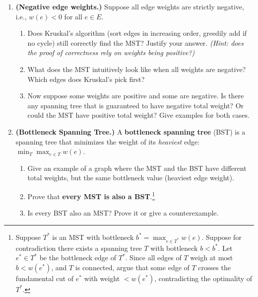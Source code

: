 \documentclass[9pt]{book}
\begin{document}
\begin{enumerate}[label=\arabic*.]
\begin{enumerate}
    \item \textbf{(Negative edge weights.)}
    Suppose all edge weights are strictly negative, i.e., $w(e) < 0$ for all $e \in E$.
    \begin{enumerate}
        \item Does Kruskal's algorithm (sort edges in increasing order, greedily add if no cycle) still correctly find the MST? Justify your answer. \textit{(Hint: does the proof of correctness rely on weights being positive?)}
        \item What does the MST intuitively look like when all weights are negative? Which edges does Kruskal's pick first?
        \item Now suppose some weights are positive and some are negative. Is there any spanning tree that is guaranteed to have negative total weight? Or could the MST have positive total weight? Give examples for both cases.
    \end{enumerate}

    \item \textbf{(Bottleneck Spanning Tree.)}
    A \textbf{bottleneck spanning tree} (BST) is a spanning tree that minimizes the weight of its \emph{heaviest} edge: $\min_{T} \max_{e \in T} w(e)$.
    \begin{enumerate}
        \item Give an example of a graph where the MST and the BST have different total weights, but the same bottleneck value (heaviest edge weight).
        \item Prove that \textbf{every MST is also a BST}.\footnote{Suppose $T^*$ is an MST with bottleneck $b^* = \max_{e \in T^*} w(e)$. Suppose for contradiction there exists a spanning tree $T$ with bottleneck $b < b^*$. Let $e^* \in T^*$ be the bottleneck edge of $T^*$. Since all edges of $T$ weigh at most $b < w(e^*)$, and $T$ is connected, argue that some edge of $T$ crosses the fundamental cut of $e^*$ with weight $< w(e^*)$, contradicting the optimality of $T^*$.}
        \item Is every BST also an MST? Prove it or give a counterexample.
    \end{enumerate}


\end{enumerate}
\end{enumerate}
\end{document}
